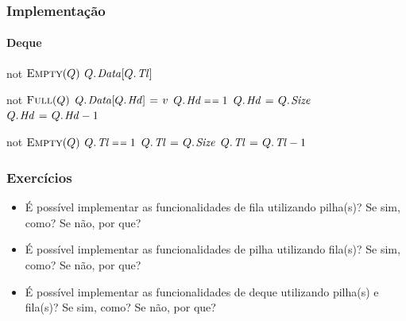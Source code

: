 \documentclass{beamer}
\begin{document}
\begin{frame}

  \frametitle{Implementação}
  \framesubtitle{Deque}

\begin{codebox}
\li  \If not $\textnormal{\scshape Empty}(Q)$
\li    \Then \Return $\attrib{Q}{Data}[\attrib{Q}{Tl}]$
     \End
\end{codebox}
\begin{codebox}
\li  \If not $\textnormal{\scshape Full}(Q)$
\li    \Then $\attrib{Q}{Data}[\attrib{Q}{Hd}] \gets v$
\li      \If $\attrib{Q}{Hd} \isequal 1$
\li        \Then $\attrib{Q}{Hd} \gets \attrib{Q}{Size}$
\li        \Else $\attrib{Q}{Hd} \gets \attrib{Q}{Hd} - 1$
         \End
     \End
\end{codebox}
\begin{codebox}
\li  \If not $\textnormal{\scshape Empty}(Q)$
\li    \Then \If $\attrib{Q}{Tl} \isequal 1$
\li      \Then $\attrib{Q}{Tl} \gets \attrib{Q}{Size}$
\li      \Else $\attrib{Q}{Tl} \gets \attrib{Q}{Tl} - 1$
       \End
     \End
\end{codebox}

\end{frame}

\begin{frame}

  \frametitle{Exercícios}

  \begin{itemize}

    \item É possível implementar as funcionalidades de fila utilizando pilha(s)?
      Se sim, como? Se não, por que?

    \item É possível implementar as funcionalidades de pilha utilizando fila(s)?
      Se sim, como? Se não, por que?

    \item É possível implementar as funcionalidades de deque utilizando pilha(s)
      e fila(s)?  Se sim, como? Se não, por que?

  \end{itemize}
\end{frame}



\end{document}
